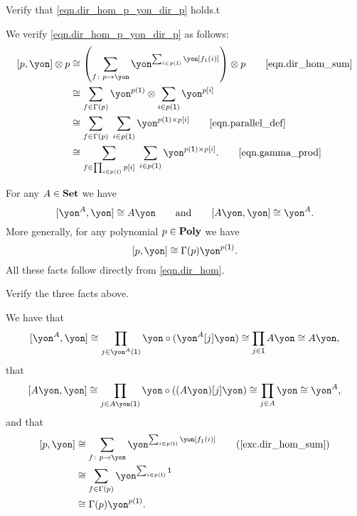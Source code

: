 \documentclass[Book-Poly]{subfiles}
\begin{document}
\begin{exercise} \label{exc.dir_hom_p_yon_dir_p}
Verify that \eqref{eqn.dir_hom_p_yon_dir_p} holds.t
\begin{solution}
We verify \eqref{eqn.dir_hom_p_yon_dir_p} as follows:
\begin{align*}
    \ihom{p, \yon} \otimes p
    &\iso
    \left(\sum_{f \colon p \to \yon} \yon^{\sum_{i \in p(\1)} \yon[f_1(i)]}\right) \otimes p
    \tag*{\eqref{eqn.dir_hom_sum}} \\
    &\iso
    \sum_{f \in \Gamma(p)} \yon^{p(\1)} \otimes \sum_{i \in p(\1)} \yon^{p[i]} \\
    &\iso
    \sum_{f \in \Gamma(p)} \; \sum_{i \in p(\1)} \yon^{p(\1) \times p[i]}
    \tag*{\eqref{eqn.parallel_def}} \\
    &\iso
    \sum_{f \in \prod_{i \in p(\1)} p[i]} \; \sum_{i \in p(\1)} \yon^{p(\1) \times p[i]}.
    \tag*{\eqref{eqn.gamma_prod}}
\end{align*}
\end{solution}
\end{exercise}

\begin{example}\label{ex.dirichlet_dual}
For any $A\in\mathbf{Set}$ we have
\[
  \ihom{\yon^A,\yon} \iso A\yon
  \qqand
  \ihom{A\yon,\yon} \iso \yon^A.
\]
More generally, for any polynomial $p\in\mathbf{Poly}$ we have
\begin{equation}\label{eqn.dir_dual}
  \ihom{p,\yon} \iso \Gamma(p)\yon^{p(\1)}.
\end{equation}
All these facts follow directly from \eqref{eqn.dir_hom}.
\end{example}

\begin{exercise}
Verify the three facts above.
\begin{solution}
We have that
\[
    \ihom{\yon^A, \yon} \iso \prod_{j \in \yon^A(\1)} \yon \circ (\yon^A[j]\yon) \iso \prod_{j \in \1} A\yon \iso A\yon,
\]
that
\[
    \ihom{A\yon, \yon} \iso \prod_{j \in A\yon(\1)} \yon \circ ((A\yon)[j]\yon) \iso \prod_{j \in A} \yon \iso \yon^A,
\]
and that
\begin{align*}
    \ihom{p, \yon} &\iso \sum_{f \colon p \to \yon} \yon^{\sum_{i \in p(\1)} \yon[f_1(i)]} \tag{\cref{exc.dir_hom_sum}} \\
    &\iso \sum_{f \in \Gamma(p)} \yon^{\sum_{i \in p(\1)} \1} \\
    &\iso \Gamma(p)\yon^{p(\1)}.
\end{align*}
\end{solution}
\end{exercise}
\end{document}
